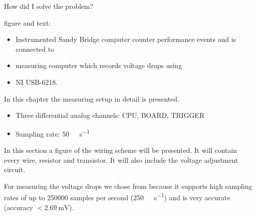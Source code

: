 
How did I solve the problem?



\label{sec:big-pic}

figure and text:

\begin{itemize}

\item Instrumented Sandy Bridge computer counter performance events and is 
      connected to

\item measuring computer which records voltage drops using

\item NI USB-6218.

\end{itemize}

\label{sec:measuring-setup}

In this chapter the measuring setup in detail is presented.



\begin{itemize}

\item Three differential analog channels: CPU, BOARD, TRIGGER

\item Sampling rate: \SI{50}{\kilo\samples\per\second}

\end{itemize}



In this section a figure of the wiring scheme will be presented. It will contain
every wire, resistor and transistor. It will also include the voltage adjustment
circuit.


\label{sec:measuring-device}

For measuring the voltage drops we chose
from  because it supports
high sampling rates of up to 250000 samples per second
(\SI{250}{\kilo\samples\per\second}) and is very
accurate (accuracy $< \SI{2.69}{\milli\volt}$)\cite{NISpec2009}.


